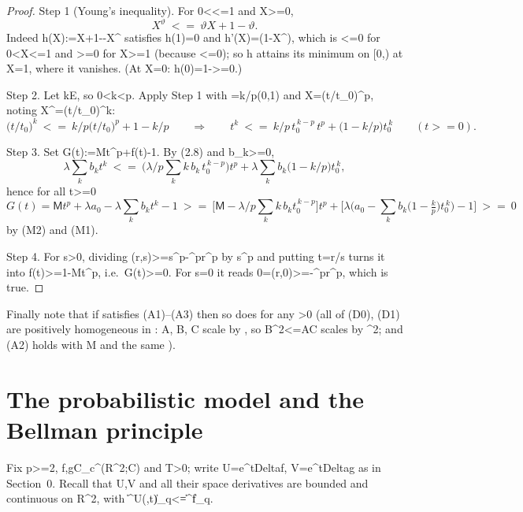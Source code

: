 \documentclass[10pt,reqno]{amsart}
\def\({}\def\){}%
\def\frac#1#2{#1/#2}%
\def\ge{>=}\def\le{<=}%
\def\Delta{Delta}\def\sigma{sigma}\def\nu{nu}%
\theoremstyle{definition}
\theoremstyle{remark}
\begin{document}
\begin{proof}
Step 1 (Young's inequality). For \(0<\vartheta\le1\) and \(X\ge0\), \[X^{\vartheta}\ \le\ \vartheta X+1-\vartheta .\] Indeed \(h(X):=\vartheta X+1-\vartheta-X^\vartheta\) satisfies \(h(1)=0\) and \(h'(X)=\vartheta(1-X^{})\), which is \(\le0\) for \(0<X\le1\) and \(\ge0\) for \(X\ge1\) (because \(\le0\)); so \(h\) attains its minimum on \([0,\infty)\) at \(X=1\), where it vanishes. (At \(X=0\): \(h(0)=1-\vartheta\ge0\).)

Step 2. Let \(k\in E\), so \(0<k<p\). Apply Step 1 with \(\vartheta=k/p\in(0,1)\) and \(X=(t/t_0)^p\), noting \(X^\vartheta=(t/t_0)^k\): \[\Big(\frac t{t_0}\Big)^{k}\ \le\ \frac kp\Big(\frac t{t_0}\Big)^{p}+1-\frac kp
\qquad\Longrightarrow\qquad
t^{k}\ \le\ \frac kp\,t_0^{\,k-p}\,t^{p}+\Big(1-\frac kp\Big)t_0^{\,k}
\qquad(t\ge0). \tag{2.8}\]

Step 3. Set \(G(t):=\mathsf Mt^p+\lambda f(t)-1\). By (2.8) and \(b_k\ge0\), \[\lambda\sum_kb_kt^k\ \le\
\Big(\frac{\lambda}{p}\sum_kk\,b_k\,t_0^{\,k-p}\Big)t^p
+\lambda\sum_kb_k\Big(1-\frac kp\Big)t_0^{\,k},\] hence for all \(t\ge0\) \[G(t)=\mathsf Mt^p+\lambda a_0-\lambda\sum_kb_kt^k-1
\ \ge\ \Big[\mathsf M-\frac{\lambda}{p}\sum_kk\,b_kt_0^{\,k-p}\Big]t^p
+\Big[\lambda\Big(a_0-\sum_kb_k\Big(1-\tfrac kp\Big)t_0^{\,k}\Big)-1\Big]\ \ge\ 0\] by (M2) and (M1).

Step 4. For \(s>0\), dividing \(\lambda\varphi(r,s)\ge s^p-\Lambda^pr^p\) by \(s^p\) and putting \(t=r/s\) turns it into \(\lambda f(t)\ge1-\mathsf Mt^p\), i.e.~\(G(t)\ge0\). For \(s=0\) it reads \(0=\lambda\varphi(r,0)\ge-\Lambda^pr^p\), which is true.
\end{proof}

Finally note that if \(\varphi\) satisfies (A1)--(A3) then so does \(\lambda\varphi\) for any \(\lambda>0\) (all of (D0), (D1) are positively homogeneous in \(\varphi\): \(\mathcal A\), \(\mathcal B\), \(\mathcal C\) scale by \(\lambda\), so \(\mathcal B^2\le\mathcal A\mathcal C\) scales by \(\lambda^2\); and (A2) holds with \(\lambda M\) and the same \(\theta\)).


\section{The probabilistic model and the Bellman principle}\label{sec:probabilistic}

Fix \(p\ge2\), \(f,g\in C_c^\infty(\mathbb R^2;\mathbb C)\) and \(T>0\); write \(U=e^{t\Delta}f\), \(V=e^{t\Delta}g\) as in Section~0. Recall that \(U,V\) and all their space derivatives are bounded and continuous on \(\mathbb R^2\times[0,T]\), with \(\|\partial^\alpha U(\cdot,t)\|_q\le\|\partial^\alpha f\|_q\).
\end{document}

